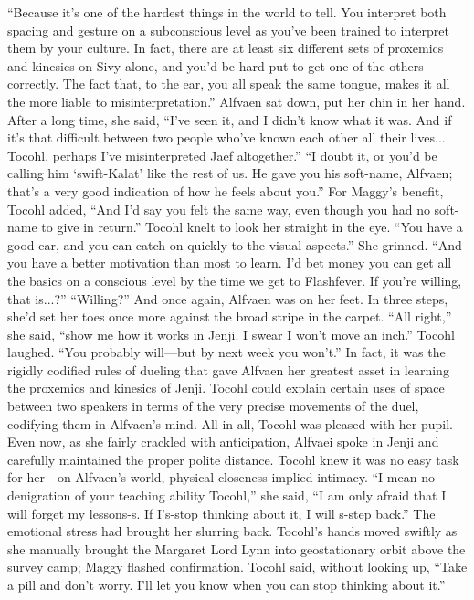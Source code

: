 \documentclass[9pt]{article}
\begin{document}
“Because it’s one of the hardest things in the world to tell. You interpret both spacing and gesture on
a subconscious level as you’ve been trained to interpret them by your culture. In fact, there are at least
six different sets of proxemics and kinesics on Sivy alone, and you’d be hard put to get one of the others
correctly. The fact that, to the ear, you all speak the same tongue, makes it all the more liable to
misinterpretation.”
Alfvaen sat down, put her chin in her hand. After a long time, she said, “I’ve seen it, and I didn’t
know what it was. And if it’s that difficult between two people who’ve known each other all their lives...
Tocohl, perhaps I’ve misinterpreted Jaef altogether.”
“I doubt it, or you’d be calling him ‘swift-Kalat’ like the rest of us. He gave you his soft-name,
Alfvaen; that’s a very good indication of how he feels about you.” For Maggy’s benefit, Tocohl added,
“And I’d say you felt the same way, even though you had no soft-name to give in return.”
Tocohl knelt to look her straight in the eye. “You have a good ear, and you can catch on quickly to
the visual aspects.” She grinned. “And you have a better motivation than most to learn. I’d bet money
you can get all the basics on a conscious level by the time we get to Flashfever. If you’re willing, that
is...?”
“Willing?” And once again, Alfvaen was on her feet. In three steps, she’d set her toes once more
against the broad stripe in the carpet. “All right,” she said, “show me how it works in Jenji. I swear I
won’t move an inch.”
Tocohl laughed. “You probably will—but by next week you won’t.”
In fact, it was the rigidly codified rules of dueling that gave Alfvaen her greatest asset in learning the
proxemics and kinesics of Jenji. Tocohl could explain certain uses of space between two speakers in
terms of the very precise movements of the duel, codifying them in Alfvaen’s mind.
All in all, Tocohl was pleased with her pupil. Even now, as she fairly crackled with anticipation,
Alfvaei spoke in Jenji and carefully maintained the proper polite distance. Tocohl knew it was no easy
task for her—on Alfvaen’s world, physical closeness implied intimacy.
“I mean no denigration of your teaching ability Tocohl,” she said, “I am only afraid that I will forget
my lessons-s. If I’s-stop thinking about it, I will s-step back.” The emotional stress had brought her
slurring back.
Tocohl’s hands moved swiftly as she manually brought the Margaret Lord Lynn into geostationary
orbit above the survey camp; Maggy flashed confirmation. Tocohl said, without looking up, “Take a pill
and don’t worry. I’ll let you know when you can stop thinking about it.”
\end{document}
